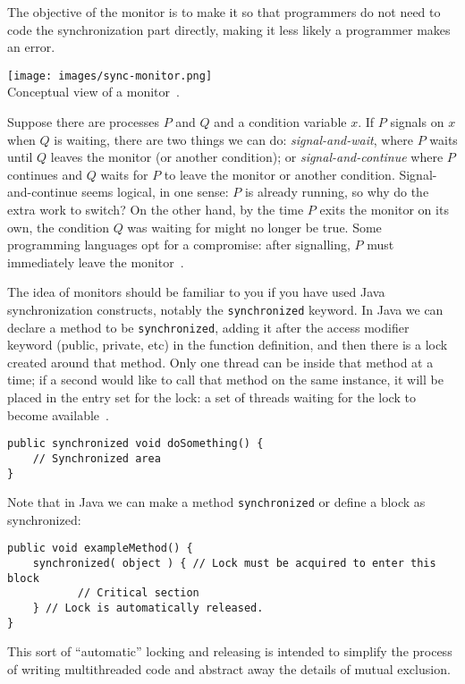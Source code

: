 The objective of the monitor is to make it so that programmers do not need to code the synchronization part directly, making it less likely a programmer makes an error.

\begin{center}
\texttt{[image: images/sync-monitor.png]}\\
Conceptual view of a monitor~\cite{osc}.
\end{center}

Suppose there are processes $P$ and $Q$ and a condition variable $x$. If $P$ signals on $x$ when $Q$ is waiting, there are two things we can do: \textit{signal-and-wait}, where $P$ waits until $Q$ leaves the monitor (or another condition); or \textit{signal-and-continue} where $P$ continues and $Q$ waits for $P$ to leave the monitor or another condition. Signal-and-continue seems logical, in one sense: $P$ is already running, so why do the extra work to switch? On the other hand, by the time $P$ exits the monitor on its own, the condition $Q$ was waiting for might no longer be true. Some programming languages opt for a compromise: after signalling, $P$ must immediately leave the monitor~\cite{osc}.

The idea of monitors should be familiar to you if you have used Java synchronization constructs, notably the \texttt{synchronized} keyword. In Java we can declare a method to be \texttt{synchronized}, adding it after the access modifier keyword (public, private, etc) in the function definition, and then there is a lock created around that method. Only one thread can be inside that method at a time; if a second would like to call that method on the same instance, it will be placed in the entry set for the lock: a set of threads waiting for the lock to become available~\cite{osc}. 

\begin{verbatim}
public synchronized void doSomething() {
    // Synchronized area
}
\end{verbatim}


Note that in Java we can make a method \texttt{synchronized} or define a block as synchronized:

\begin{verbatim}
public void exampleMethod() {
    synchronized( object ) { // Lock must be acquired to enter this block
           // Critical section 
    } // Lock is automatically released.
}
\end{verbatim}

This sort of ``automatic'' locking and releasing is intended to simplify the process of writing multithreaded code and abstract away the details of mutual exclusion.

